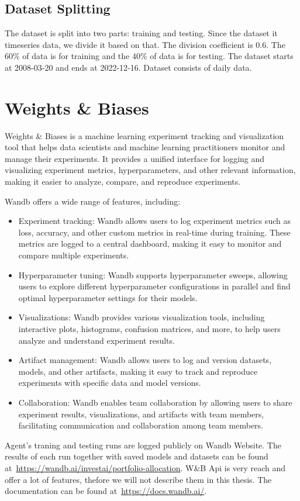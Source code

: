 \documentclass[../xlapes02]{subfiles}
\begin{document}
    \subsection{Dataset Splitting}\label{subsec:dataset-splitting}
    The dataset is split into two parts: training and testing. Since the dataset it timeseries data, we divide it based on that. The division coefficient is $0.6$.
    The $60\%$ of data is for training and the $40\%$ of data is for testing. The dataset starts at 2008-03-20 and ends at 2022-12-16.
    Dataset consists of daily data.


    \section{Weights \& Biases}\label{subsubsec:wandb}
    Weights \& Biases is a machine learning experiment tracking and visualization tool that helps data scientists and machine learning practitioners monitor and manage their experiments. It provides a unified interface for logging and visualizing experiment metrics, hyperparameters, and other relevant information, making it easier to analyze, compare, and reproduce experiments.

    Wandb offers a wide range of features, including:
    \begin{itemize}
        \item Experiment tracking: Wandb allows users to log experiment metrics such as loss, accuracy, and other custom metrics in real-time during training. These metrics are logged to a central dashboard, making it easy to monitor and compare multiple experiments.
        \item Hyperparameter tuning: Wandb supports hyperparameter sweeps, allowing users to explore different hyperparameter configurations in parallel and find optimal hyperparameter settings for their models.
        \item Visualizations: Wandb provides various visualization tools, including interactive plots, histograms, confusion matrices, and more, to help users analyze and understand experiment results.
        \item Artifact management: Wandb allows users to log and version datasets, models, and other artifacts, making it easy to track and reproduce experiments with specific data and model versions.
        \item Collaboration: Wandb enables team collaboration by allowing users to share experiment results, visualizations, and artifacts with team members, facilitating communication and collaboration among team members.
    \end{itemize}

    Agent's traning and testing runs are logged publicly on Wandb Website. The results of each run together with saved models and datasets can be found at~\url{https://wandb.ai/investai/portfolio-allocation}.
    W\&B Api is very reach and offer a lot of features, thefore we will not describe them in this thesis. The documentation can be found at~\url{https://docs.wandb.ai/}.
\end{document}
